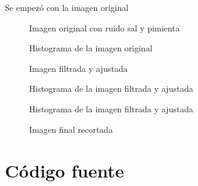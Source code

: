 \documentclass[10pt,journal,compsoc]{IEEEtran}\usepackage[T1]{fontenc}                              %
\begin{document}
\graphicspath{{ReporteImagenes/}}
Se empezó con la imagen original


\begin{figure}[!h]
	\caption{Imagen original con ruido sal y pimienta}
	\centering
\end{figure}


\begin{figure}[!h]
	\caption{Histograma de la imagen original}
	\centering
\end{figure}


\begin{figure}[!h]
	\caption{Imagen filtrada y ajustada}
	\centering
\end{figure}


\begin{figure}[!h]
	\caption{Histograma de la imagen filtrada y ajustada}
	\centering
\end{figure}


\begin{figure}[!h]
	\caption{Histograma de la imagen filtrada y ajustada}
	\centering
\end{figure}


\begin{figure}[!h]
	\caption{Imagen final recortada}
	\centering
\end{figure}



\section{Código fuente}
\end{document}
